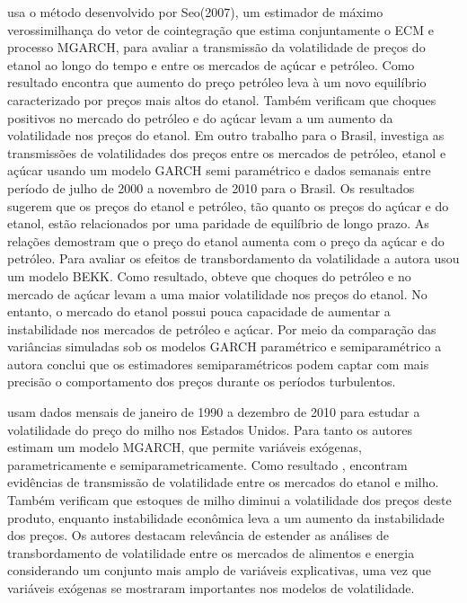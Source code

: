 	
	  usa o método desenvolvido por Seo(2007), um estimador de máximo verossimilhança do vetor de cointegração que estima conjuntamente o ECM e 	processo MGARCH, para avaliar a transmissão da volatilidade de preços do etanol ao longo do tempo e entre os mercados de açúcar e petróleo. Como resultado encontra que aumento do preço petróleo leva à  um novo equilíbrio caracterizado por preços mais altos do etanol.  Também verificam que choques positivos no mercado do petróleo e do açúcar levam a um aumento da volatilidade nos preços do etanol.  Em outro trabalho para o Brasil,  investiga as transmissões de volatilidades dos preços entre os mercados de petróleo, etanol e açúcar  usando um modelo GARCH semi paramétrico e dados semanais entre período de julho de 2000 a novembro de 2010 para o Brasil. Os resultados sugerem que os preços do etanol e petróleo, tão quanto os preços do açúcar e do etanol, estão relacionados por uma paridade de equilíbrio de longo prazo. As relações demostram que o preço do etanol aumenta com o preço da açúcar e do petróleo. Para avaliar os efeitos de transbordamento da volatilidade a autora usou um modelo BEKK. Como resultado, obteve que choques do petróleo e no mercado de açúcar levam a uma maior volatilidade nos preços do etanol. No entanto, o mercado do etanol possui pouca capacidade de aumentar a instabilidade nos mercados de petróleo e açúcar. Por meio da comparação  das variâncias simuladas sob os modelos  GARCH paramétrico e semiparamétrico a autora conclui que os estimadores  semiparamétricos podem captar com mais precisão o comportamento dos preços durante os períodos turbulentos.
	
	 usam dados mensais de janeiro de 1990 a dezembro de 2010 para estudar a volatilidade do preço do milho nos Estados Unidos. Para tanto os autores estimam um modelo MGARCH, que permite variáveis exógenas,  parametricamente e semiparametricamente. Como resultado , encontram evidências de transmissão de volatilidade entre os mercados do etanol e milho. Também verificam que estoques de milho diminui a volatilidade dos preços deste produto, enquanto instabilidade econômica leva a um aumento da instabilidade dos preços. Os autores destacam relevância de estender as análises de transbordamento de volatilidade entre os mercados de alimentos e energia considerando um conjunto mais amplo de variáveis explicativas, uma vez que  variáveis exógenas se mostraram importantes nos modelos de volatilidade.
	
